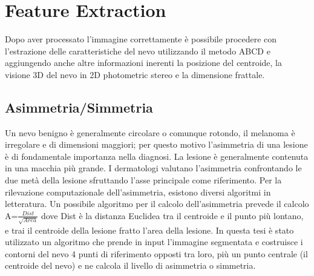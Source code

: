 {\section{Feature Extraction}
Dopo aver processato l'immagine correttamente è possibile procedere con l'estrazione delle caratteristiche del nevo utilizzando il metodo ABCD e aggiungendo anche altre informazioni inerenti la posizione del centroide, la visione 3D del nevo in 2D photometric stereo e la dimensione frattale. 
\subsection{Asimmetria/Simmetria}
Un nevo benigno è generalmente circolare o comunque rotondo, il melanoma è irregolare e di dimensioni maggiori; per questo motivo l'asimmetria di una lesione è di fondamentale importanza nella diagnosi. 
\newline
La lesione è generalmente contenuta in una macchia più grande. I dermatologi valutano l'asimmetria confrontando le due metà della lesione sfruttando l'asse principale come riferimento.
\newline
Per la rilevazione computazionale dell'asimmetria, esistono diversi algoritmi in letteratura.
\newline
Un possibile algoritmo per il calcolo dell'asimmetria \cite{stoecker2005detection} prevede il calcolo A=$\frac{Dist}{\sqrt{Area}}$ dove Dist è la distanza Euclidea tra il centroide e il punto più lontano, e trai il centroide della lesione fratto l'area della lesione.
\newline
In questa tesi è stato utilizzato un algoritmo che prende in input l'immagine segmentata e costruisce i contorni del nevo 4 punti di riferimento opposti tra loro, più un punto centrale (il centroide del nevo) e ne calcola il livello di asimmetria o simmetria.

}

